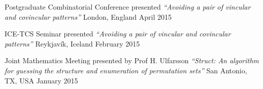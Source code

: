 \begin{cvhonors}

\cvhonor
  {Postgraduate Combinatorial Conference} %
  {presented \textit{``Avoiding a pair of vincular and covincular patterns''}} %
  {London, England} %
  {April 2015} %


\cvhonor
  {ICE-TCS Seminar} %
  {presented \textit{``Avoiding a pair of vincular and covincular patterns''}} %
  {Reykjavík, Iceland} %
  {February 2015} %


\cvhonor
  {Joint Mathematics Meeting} %
  {presented by Prof H. Ulfarsson \textit{``Struct: An algorithm for guessing the structure and enumeration of permutation sets''}} %
  {San Antonio, TX, USA} %
  {January 2015} %

\end{cvhonors}
